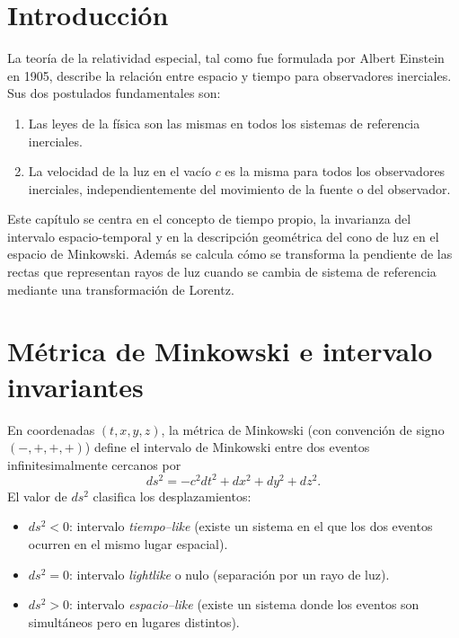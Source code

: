 \documentclass[12pt,oneside]{book}
\begin{document}
\frontmatter
\tableofcontents
\mainmatter

\chapter{Introducción}
La teoría de la relatividad especial, tal como fue formulada por Albert Einstein en 1905, describe la relación entre espacio y tiempo para observadores inerciales. Sus dos postulados fundamentales son:
\begin{enumerate}
  \item Las leyes de la física son las mismas en todos los sistemas de referencia inerciales.
  \item La velocidad de la luz en el vacío $c$ es la misma para todos los observadores inerciales, independientemente del movimiento de la fuente o del observador.
\end{enumerate}
Este capítulo se centra en el concepto de tiempo propio, la invarianza del intervalo espacio-temporal y en la descripción geométrica del cono de luz en el espacio de Minkowski. Además se calcula cómo se transforma la pendiente de las rectas que representan rayos de luz cuando se cambia de sistema de referencia mediante una transformación de Lorentz.

\chapter{Métrica de Minkowski e intervalo invariantes}
En coordenadas $(t,x,y,z)$, la métrica de Minkowski (con convención de signo $(-,+,+,+)$) define el intervalo de Minkowski entre dos eventos infinitesimalmente cercanos por
\begin{equation}\label{eq:intervalo}
  ds^2 = -c^2 dt^2 + dx^2 + dy^2 + dz^2.
\end{equation}
El valor de $ds^2$ clasifica los desplazamientos:
\begin{itemize}
  \item $ds^2<0$: intervalo {\it tiempo--like} (existe un sistema en el que los dos eventos ocurren en el mismo lugar espacial).
  \item $ds^2=0$: intervalo {\it lightlike} o nulo (separación por un rayo de luz).
  \item $ds^2>0$: intervalo {\it espacio--like} (existe un sistema donde los eventos son simultáneos pero en lugares distintos).
\end{itemize}
\end{document}
